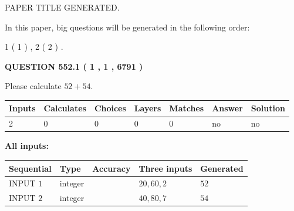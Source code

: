 \documentclass[12pt]{article}
\begin{document}
   
\vspace{0.2in}
   
   
   
   
   
   
   
   
 \vspace{0.2in}
 
 
 
 
   
   
 PAPER TITLE GENERATED.
   
   
   
\vspace{0.2in}
   
In this paper, big questions will be generated in the following order: 
   
   
   1 ( 1 )
 ,
   2 ( 2 )
 .
  
\vspace{0.2in}
  
{\textbf{\Large{QUESTION
552.1 
 ( 1 , 1 , 6791 )
}}}
  
  
 
Please calculate $ %
52 +  %
54 $.
 
 
   
   
   
   
\noindent\begin{tabular}{|l|l|l|l|l|l|l|}
 \hline
Inputs & Calculates & Choices & Layers & Matches & Answer & Solution \\ \hline
 2  & 
 0  & 
 0
  & 
 0  & 
 0  & 
  no & 
  no 
  \\ \hline
 \end{tabular}
   
   
   
   
\noindent{}
   
   
   
   
\noindent\vspace{0.1in}\hspace{-0.08in} {\textbf{\Large{All inputs: }}}
   
   
  
  
\noindent\begin{tabular}{|l|l|l|l|l|}
\hline
 Sequential & Type & Accuracy & Three inputs & Generated \\ 
\hline
 
 
  INPUT $  1 $ & integer &  & $
 20
 , 
 60
 , 
 2
 $ & $ 52 $ 
 \\  \hline  
 
 
  INPUT $  2 $ & integer &  & $
 40
 , 
 80
 , 
 7
 $ & $ 54 $ 
 \\  \hline  
 \end{tabular}
   
\end{document}
